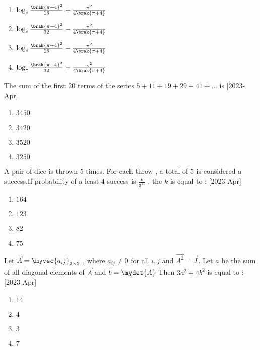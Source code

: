     \begin{multicols}{2}
    \begin{enumerate}
        \item $\log_e \frac{\brak{\pi +4}^2}{16} + \frac{\pi ^2}{4 \brak{\pi + 4}}$\\
        \item $\log_e \frac{\brak{\pi +4}^2}{32} - \frac{\pi ^2}{4 \brak{\pi + 4}}$
        \item $\log_e \frac{\brak{\pi +4}^2}{16} - \frac{\pi ^2}{4 \brak{\pi + 4}}$\\
        \item $\log_e \frac{\brak{\pi +4}^2}{32} + \frac{\pi ^2}{4 \brak{\pi + 4}}$
    \end{enumerate}
    \end{multicols}
     \item The sum of the first $20$ terms of the series $ 5 + 11 + 19 + 29 + 41 + \dots $ is \hfill[2023-Apr]
    \begin{multicols}{2}
    \begin{enumerate}
        \item $3450$
        \item $3420$\\
        \item $3520$
        \item $3250$
    \end{enumerate}
    \end{multicols}
    \item A pair of dice is thrown $5$ times. For each throw , a total of $5$ is considered a success.If probability of a least $4$ success is $\frac{k}{3^{11}}$ , the $k$ is equal to : \hfill[2023-Apr]
    \begin{multicols}{2}
        \begin{enumerate}
            \item $164$
            \item $123$\\
            \item $82$
            \item $75$
        \end{enumerate}
    \end{multicols}
    \item Let $\vec{A} = \myvec{a_{ij}}_{2 \times 2}$ , where $a_{ij} \neq 0$ for all $i , j$ and $\vec{A^2} = \vec{I}$. Let $a$ be the sum of all diagonal elements of $\vec{A}$ and $b = \mydet{A}$ Then $3a^2 + 4b^2$ is equal to : \hfill[2023-Apr]
    \begin{multicols}{2}
    \begin{enumerate}
        \item $14$
        \item $4$\\
        \item $3$
        \item $7$
    \end{enumerate}
    \end{multicols}

